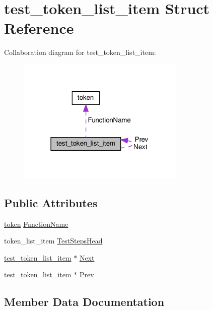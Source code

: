 \hypertarget{structtest__token__list__item}{}\section{test\+\_\+token\+\_\+list\+\_\+item Struct Reference}
\label{structtest__token__list__item}


Collaboration diagram for test\+\_\+token\+\_\+list\+\_\+item\+:
\nopagebreak
\begin{figure}[H]
\begin{center}
\leavevmode
\includegraphics[width=226pt]{d0/d11/structtest__token__list__item__coll__graph}
\end{center}
\end{figure}
\subsection*{Public Attributes}
\begin{DoxyCompactItemize}
\item 
\hyperlink{structtoken}{token} \hyperlink{structtest__token__list__item_a48319a908d351d150a224fd1ece758d7}{Function\+Name}
\item 
token\+\_\+list\+\_\+item \hyperlink{structtest__token__list__item_a30e55573c651ec80614b75f9b180dc80}{Test\+Steps\+Head}
\item 
\hyperlink{structtest__token__list__item}{test\+\_\+token\+\_\+list\+\_\+item} $\ast$ \hyperlink{structtest__token__list__item_a271ea32ddd03b4f6bb44237881915692}{Next}
\item 
\hyperlink{structtest__token__list__item}{test\+\_\+token\+\_\+list\+\_\+item} $\ast$ \hyperlink{structtest__token__list__item_aa053b5098e750d72759f6520d287c74d}{Prev}
\end{DoxyCompactItemize}


\subsection{Member Data Documentation}
\mbox{\label{structtest__token__list__item_a48319a908d351d150a224fd1ece758d7}} 
